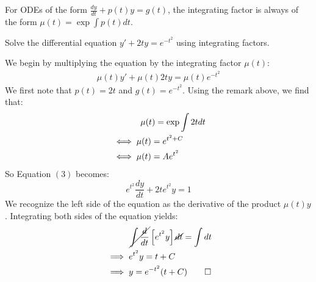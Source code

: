 \begin{remark}
    For ODEs of the form $\frac{dy}{dt} + p(t)y = g(t)$, the integrating factor is always of the form $\mu(t) = \exp \int p(t)dt$.
\end{remark}

\begin{example}
    Solve the differential equation $y' + 2ty = e^{-t^2}$ using integrating factors.
\end{example}
\begin{solution}
    We begin by multiplying the equation by the integrating factor $\mu(t)$:
    \begin{align}
        \mu(t)y' + \mu(t)2ty = \mu(t)e^{-t^2}
    \end{align}
    We first note that $p(t) = 2t$ and $g(t) = e^{-t^2}$. Using the remark above, we find that:
    \begin{align*}
        & \hspace{1.2cm} \mu(t) = \exp \int 2t dt \\ 
        &\iff \mu(t) = e^{t^2 + C} \\
        &\iff \mu(t) = Ae^{t^2}
    \end{align*}
    So Equation $(3)$ becomes:
    \[ e^{t^2}\frac{dy}{dt} + 2te^{t^2}y = 1 \]
    We recognize the left side of the equation as the derivative of the product $\mu(t)y$. Integrating both sides of the equation yields:
    \begin{align*}
        & \hspace{1cm} \cancel{\int \frac{d}{dt}}\left[e^{t^2}y\right] \cancel{dt} = \int dt \\
        & \implies e^{t^2}y = t + C \\
        & \implies y = e^{-t^2}(t + C) \qedhere
    \end{align*}
\end{solution}